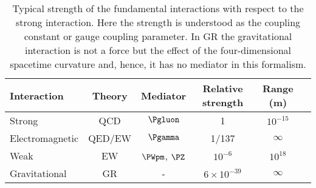\begin{table}[]
\centering
\begin{tabular}{l c c c c c}
\toprule
Interaction     		& Theory  			& Mediator             	& Relative strength 	& Range (m) 	\\ \midrule
Strong          		& QCD	 		& $\Pgluon$              	& 1                		& $10^{-15}$    \\
Electromagnetic 	& QED/EW 		& $\Pgamma$          	&  1/137                	& $\infty$         	\\
Weak            		& EW   			& $\PWpm$, $\PZ$	&  $10^{-6}$              & $10^{18}$      \\
Gravitational     		& GR       			& -		 		&  $6\times10^{-39}$	& $\infty$  	\\ \bottomrule          
\end{tabular}
\caption{Typical strength of the fundamental interactions with respect to the strong interaction. Here the strength is understood as the coupling constant or gauge coupling parameter. 
In GR the gravitational interaction is not a force but the effect of the four-dimensional spacetime curvature and, hence, it has no mediator in this formalism.}
\label{tab:Chap1:FundamentalInteractions}
\end{table}




